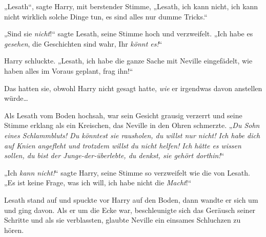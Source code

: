 „Lesath“, sagte Harry, mit berstender Stimme, „Lesath, ich kann nicht, ich kann nicht wirklich solche Dinge tun, es sind alles nur dumme Tricks.“

„Sind sie \emph{nicht}!“ sagte Lesath, seine Stimme hoch und verzweifelt. „Ich habe es \emph{gesehen}, die Geschichten sind wahr, Ihr \emph{könnt es!}“

Harry schluckte. „Lesath, ich habe die ganze Sache mit Neville eingefädelt, wie haben alles im Voraus geplant, frag ihn!“

Das hatten sie, obwohl Harry nicht gesagt hatte, \emph{wie} er irgendwas davon anstellen würde…

Als Lesath vom Boden hochsah, war sein Gesicht grausig verzerrt und seine Stimme erklang als ein Kreischen, das Neville in den Ohren schmerzte. „\emph{Du Sohn eines Schlammbluts! Du könntest sie rausholen, du willst nur nicht! Ich habe dich auf Knien angefleht und trotzdem willst du nicht helfen! Ich hätte es wissen sollen, du bist der Junge-der-überlebte, du denkst, sie gehört dorthin!}“

„Ich \emph{kann nicht!}“ sagte Harry, seine Stimme so verzweifelt wie die von Lesath. „Es ist keine Frage, was ich will, ich habe nicht die \emph{Macht}!“

Lesath stand auf und spuckte vor Harry auf den Boden, dann wandte er sich um und ging davon. Als er um die Ecke war, beschleunigte sich das Geräusch seiner Schritte und als sie verblassten, glaubte Neville ein einsames Schluchzen zu hören.

